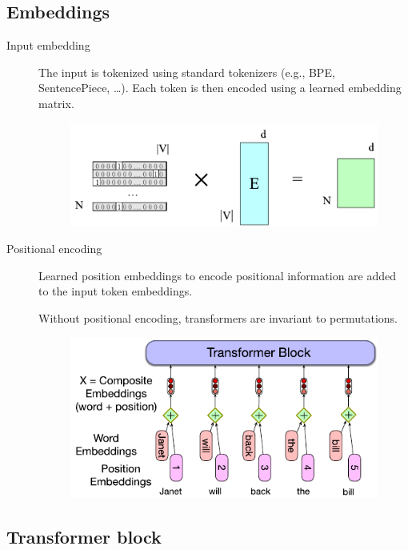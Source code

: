 \subsection{Embeddings}

\begin{description}
    \item[Input embedding] 
        The input is tokenized using standard tokenizers (e.g., BPE, SentencePiece, \dots). Each token is then encoded using a learned embedding matrix.

        \begin{figure}[H]
            \centering
            \includegraphics[width=0.45\linewidth]{./img/_transformer_embedding.pdf}
        \end{figure}

    \item[Positional encoding] 
        Learned position embeddings to encode positional information are added to the input token embeddings.

        \begin{remark}
            Without positional encoding, transformers are invariant to permutations.
        \end{remark}

        \begin{figure}[H]
            \centering
            \includegraphics[width=0.45\linewidth]{./img/_positional_encoding.pdf}
        \end{figure}
\end{description}


\subsection{Transformer block}

